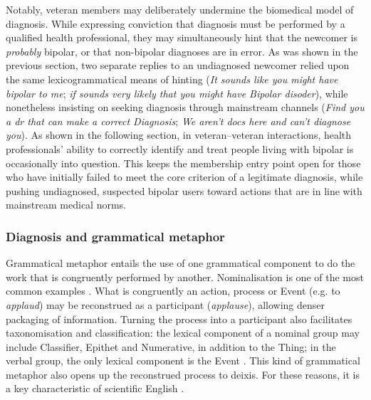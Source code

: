 \documentclass{article}
\renewcommand{\cite}{\parencite}
\begin{document}
{Notably, veteran members may deliberately undermine the biomedical model of diagnosis. While expressing conviction that diagnosis must be performed by a qualified health professional, they may simultaneously hint that the newcomer is \emph{probably} bipolar, or that non-bipolar diagnoses are in error. As was shown in the previous section, two separate replies to an undiagnosed newcomer relied upon the same lexicogrammatical means of hinting (\emph{It sounds like you might have bipolar to me}; \emph{if sounds very likely that you might have Bipolar disoder}), while nonetheless insisting on seeking diagnosis through mainstream channels (\emph{Find you a dr that can make a correct Diagnosis}; \emph{We aren't docs here and can't diagnose you}). As shown in the following section, in veteran--veteran interactions, health professionals' ability to correctly identify and treat people living with bipolar is occasionally into question. This keeps the membership entry point open for those who have initially failed to meet the core criterion of a legitimate diagnosis, while pushing undiagnosed, suspected bipolar users toward actions that are in line with mainstream medical norms. %

\subsubsection{Diagnosis and grammatical metaphor}

Grammatical metaphor entails the use of one grammatical component to do the work that is congruently performed by another. Nominalisation is one of the most common examples \cite{simon-vandenbergen_grammatical_2003}. What is congruently an action, process or Event (e.g. to \emph{applaud}) may be reconstrued as a participant (\emph{applause}), allowing denser packaging of information. Turning the process into a participant also facilitates taxonomisation and classification: the lexical component of a nominal group may include Classifier, Epithet and Numerative, in addition to the Thing; in the verbal group, the only lexical component is the Event \cite{halliday_introduction_2004}. This kind of grammatical metaphor also opens up the reconstrued process to deixis. For these reasons, it is a key characteristic of scientific English \cite{halliday1999construing}. 

}
\end{document}
